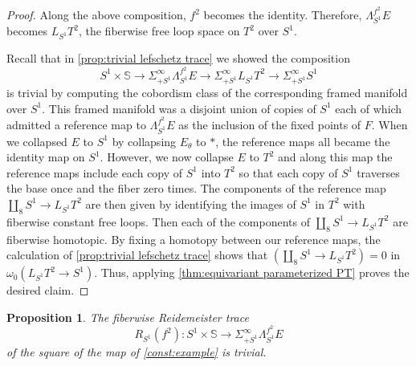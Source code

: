 \documentclass[11pt]{amsart}
\newcommand{\Sph}{\mathbb{S}}
\theoremstyle{plain}   %
\newtheorem{prop}[thm]{Proposition}
\theoremstyle{definition}
\theoremstyle{remark}
\numberwithin{equation}{section}
\begin{document}
\begin{proof}
Along the above composition, $f^2$ becomes the identity. Therefore, $\Lambda_{S^1}^{f^2}E$ becomes $L_{S^1}T^2$, the fiberwise free loop space on $T^2$ over $S^1$. 

Recall that in \cref{prop:trivial lefschetz trace} we showed the composition
\[
S^1\times \Sph \to \Sigma_{+S^1}^\infty \Lambda_{S^1}^{f^2}E \to \Sigma_{+S^1}^\infty L_{S^1} T^2 \to \Sigma^\infty_{+S^1} S^1
\]
is trivial by computing the cobordism class of the corresponding framed manifold over $S^1$. This framed manifold was a disjoint union of copies of $S^1$ each of which admitted a reference map to $\Lambda_{S^1}^{f^2} E$ as the inclusion of the fixed points of $F$. When we collapsed $E$ to $S^1$ by collapsing $E_\theta$ to $*$, the reference maps all became the identity map on $S^1$. However, we now collapse $E$ to $T^2$ and along this map the reference maps include each copy of $S^1$ into $T^2$ so that each copy of $S^1$ traverses the base once and the fiber zero times. The components of the reference map $\amalg_8 S^1 \to L_{S^1}T^2$ are then given by identifying the images of $S^1$ in $T^2$ with fiberwise constant free loops. Then each of the components of $\amalg_8 S^1\to L_{S^1} T^2$ are fiberwise homotopic. By fixing a homotopy between our reference maps, the calculation of \cref{prop:trivial lefschetz trace} shows that $(\amalg_8 S^1 \to L_{S^1}T^2)=0$ in $\omega_0(L_{S^1}T^2\to S^1)$. Thus, applying \cref{thm:equivariant parameterized PT} proves the desired claim. 
\end{proof}

\begin{prop}\label{prop:trivial f^2}
The fiberwise Reidemeister trace
\[
R_{S^1}(f^2) :S^1\times \Sph \to \Sigma_{+S^1}^\infty \Lambda_{S^1}^{f^2} E
\]
of the square of the map of \cref{const:example} is trivial.
\end{prop}
\end{document}
